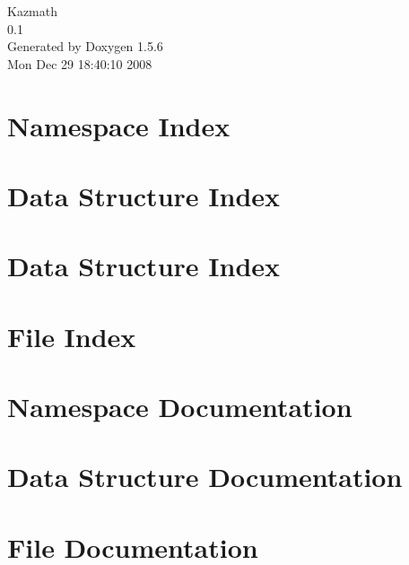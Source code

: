 \documentclass[a4paper]{book}
\begin{document}
\begin{titlepage}
\vspace*{7cm}
\begin{center}
{\Large Kazmath \\[1ex]\large 0.1 }\\
\vspace*{1cm}
{\large Generated by Doxygen 1.5.6}\\
\vspace*{0.5cm}
{\small Mon Dec 29 18:40:10 2008}\\
\end{center}
\end{titlepage}
\clearemptydoublepage
{}
\tableofcontents
\clearemptydoublepage
{}
\chapter{Namespace Index}

\chapter{Data Structure Index}

\chapter{Data Structure Index}

\chapter{File Index}

\chapter{Namespace Documentation}

\chapter{Data Structure Documentation}















\chapter{File Documentation}
























\printindex
\end{document}
